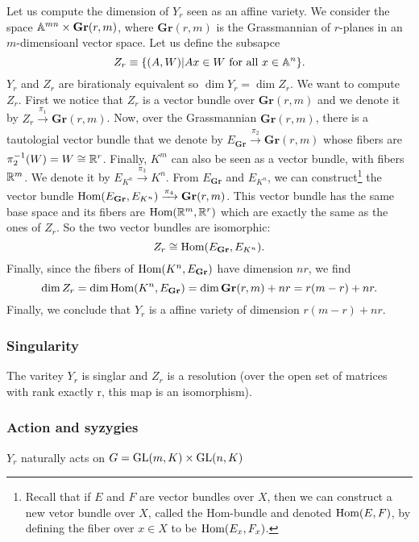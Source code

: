             Let us compute the dimension of $Y_r$ seen as an affine variety. We consider the space $\mathbb{A}^{mn}\times\textbf{Gr}(r,m)$, where $\textbf{Gr}(r,m)$ is the Grassmannian of $r$-planes in an $m$-dimensioanl vector space. Let us define the subsapce
            \begin{equation}
                Z_r\equiv\{(A,W)|Ax\in W\text{ for all } x\in\mathbb{A}^{n}\}.
            \end{equation}
            $Y_r$ and $Z_r$ are birationaly equivalent so $\dim Y_r=\dim Z_r$. We want to compute $Z_r$. First we notice that $Z_r$ is a vector bundle over $\textbf{Gr}(r,m)$ and we denote it by $Z_r\xrightarrow[]{\pi_1}\textbf{Gr}(r,m)$. Now, over the Grassmannian $\textbf{Gr}(r,m)$, there is a tautologial vector bundle that we denote by $E_{\textbf{Gr}}\xrightarrow[]{\pi_2}\textbf{Gr}(r,m)$ whose fibers are $\pi^{-1}_2(W)=W\cong\mathbb{R}^r$. Finally, $K^m$ can also be seen as a vector bundle, with fibers $\mathbb{R}^m$. We denote it by $E_{K^n}\xrightarrow[]{\pi_3}K^n$. From $E_{\textbf{Gr}}$ and $E_{K^n}$, we can construct\footnote{Recall that if $E$ and $F$ are vector bundles over $X$, then we can construct a new vetor bundle over $X$, called the Hom-bundle and denoted $\text{Hom}(E,F)$, by defining the fiber over $x\in X$ to be $\text{Hom}(E_x,F_x)$.} the vector bundle $\text{Hom}(E_{\textbf{Gr}},E_{K^n})\xrightarrow[]{\pi_4}\textbf{Gr}(r,m)$. This vector bundle has the same base space and its fibers are $\text{Hom}(\mathbb{R}^m,\mathbb{R}^r)$ which are exactly the same as the ones of $Z_r$. So the two vector bundles are isomorphic:
            \begin{equation}
                Z_r\cong\text{Hom}(E_{\textbf{Gr}},E_{K^n}).
            \end{equation}
            Finally, since the fibers of $\text{Hom}(K^n,E_{\textbf{Gr}})$ have dimension $nr$, we find
            \begin{equation}
                \dim Z_r = \dim\text{Hom}(K^n,E_{\textbf{Gr}}) = \dim\textbf{Gr}(r,m)+nr = r(m-r)+nr.
            \end{equation}
            Finally, we conclude that $Y_r$ is a affine variety of dimension $r(m-r)+nr$.

        \subsubsection{Singularity}
        
            The varitey $Y_r$ is singlar and $Z_r$ is a resolution (over the open set of matrices with rank exactly r, this map is an isomorphism)\marker.

        \subsubsection{Action and syzygies}

            $Y_r$ naturally acts on $G=\text{GL}(m,K)\times\text{GL}(n,K)$

        
        

